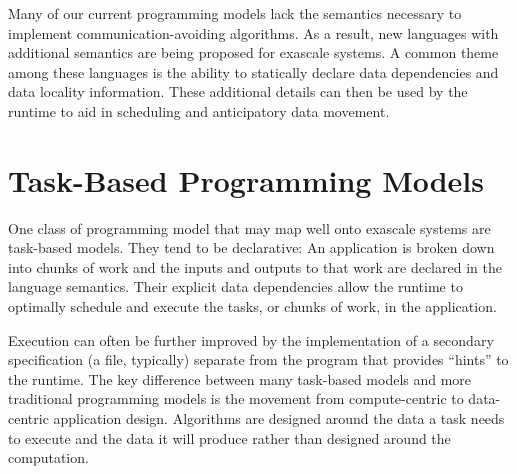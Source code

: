 Many of our current programming models lack the semantics necessary to
implement communication-avoiding algorithms. As a result, new
languages with additional semantics are being proposed for exascale
systems. A common theme among these languages is the ability to
statically declare data dependencies and data locality information.
These additional details can then be used by the runtime to aid in
scheduling and anticipatory data movement.

\section{Task-Based Programming Models}

One class of programming model that may map well onto exascale systems
are task-based models. They tend to be declarative: An application is
broken down into chunks of work and the inputs and outputs to that
work are declared in the language semantics. Their explicit data
dependencies allow the runtime to optimally schedule and execute the
tasks, or chunks of work, in the application.

Execution can often be further improved by the implementation of a
secondary specification (a file, typically) separate from the program
that provides ``hints'' to the runtime. The key difference between many
task-based models and more traditional programming models is the
movement from compute-centric to data-centric application design.
Algorithms are designed around the data a task needs to execute and
the data it will produce rather than designed around the computation.

